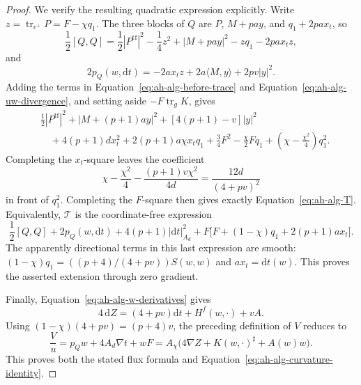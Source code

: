 \begin{proof}
We verify the resulting quadratic expression explicitly.  Write
\(z=\operatorname{tr}_{e^\perp}P=F-\chi q_1\).  The three blocks
of \(Q\) are \(P\), \(M+pa y\), and \(q_1+2pa x_t\), so
\[
 \frac12[Q,Q]
   =\frac12|P^{\mathrm{tf}}|^2-\frac14z^2
      +|M+pa y|^2-zq_1-2pa x_tz ,
\]
and
\[
 2p_Q(w,\mathrm dt)
    =-2a x_tz+2a\langle M,y\rangle+2pv|y|^2 .
\]
Adding the terms in
Equation~\eqref{eq:ah-alg-before-trace} and
Equation~\eqref{eq:ah-alg-uw-divergence}, and setting aside
\(-F\operatorname{tr}_gK\), gives
\begin{align*}
 &\frac12|P^{\mathrm{tf}}|^2
   +|M+(p+1)a y|^2+[4(p+1)-v]|y|^2\\
 &\quad+4(p+1)d x_t^2+2(p+1)a\chi x_tq_1
       +\frac34F^2-\frac{\chi}{2}Fq_1
       +\left(\chi-\frac{\chi^2}{4}\right)q_1^2 .
\end{align*}
Completing the \(x_t\)-square leaves the coefficient
\[
 \chi-\frac{\chi^2}{4}
      -\frac{(p+1)v\chi^2}{4d}
   =\frac{12d}{(4+pv)^2}
\]
in front of \(q_1^2\).  Completing the \(F\)-square then gives
exactly Equation~\eqref{eq:ah-alg-T}.  Equivalently,
\(\mathcal T\) is the coordinate-free expression
\[
 \frac12[Q,Q]+2p_Q(w,\mathrm dt)
   +4(p+1)|\mathrm dt|_{A_d}^2
   +F\bigl[F+(1-\chi)q_1+2(p+1)a x_t\bigr].
\]
The apparently directional terms in this last expression are smooth:
\((1-\chi)q_1=((p+4)/(4+pv))S(w,w)\) and
\(a x_t=\mathrm dt(w)\).  This proves the asserted extension through
zero gradient.

Finally, Equation~\eqref{eq:ah-alg-w-derivatives} gives
\[
 4\,\mathrm dZ=(4+pv)\mathrm dt+H^f(w,\cdot)+vA.
\]
Using
\((1-\chi)(4+pv)=(p+4)v\), the preceding definition of \(V\)
reduces to
\begin{equation}
 \frac Vu=p_Qw+4A_d\nabla t+wF
       =A_\chi\bigl(4\nabla Z+K(w,\cdot)^\sharp+A(w)w\bigr).
 \label{eq:ah-alg-flux-reduction}
\end{equation}
This proves both the stated flux formula and
Equation~\eqref{eq:ah-alg-curvature-identity}.
\end{proof}

